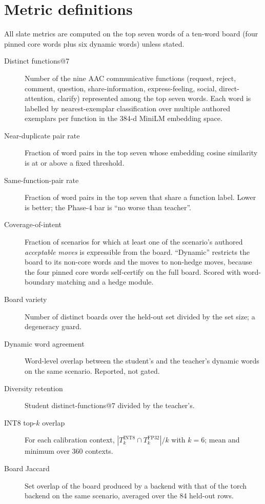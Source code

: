 \section{Metric definitions}\label{app:metrics}

All slate metrics are computed on the top seven words of a ten-word board (four
pinned core words plus six dynamic words) unless stated.

\begin{description}
\item[Distinct functions@7] Number of the nine AAC communicative functions
(request, reject, comment, question, share-information, express-feeling, social,
direct-attention, clarify) represented among the top seven words. Each word is
labelled by nearest-exemplar classification over multiple authored exemplars per
function in the 384-d MiniLM embedding space.
\item[Near-duplicate pair rate] Fraction of word pairs in the top seven whose
embedding cosine similarity is at or above a fixed threshold.
\item[Same-function-pair rate] Fraction of word pairs in the top seven that share
a function label. Lower is better; the Phase-4 bar is ``no worse than teacher''.
\item[Coverage-of-intent] Fraction of scenarios for which at least one of the
scenario's authored \emph{acceptable moves} is expressible from the board.
``Dynamic'' restricts the board to its non-core words and the moves to
non-hedge moves, because the four pinned core words self-certify on the full
board. Scored with word-boundary matching and a hedge module.
\item[Board variety] Number of distinct boards over the held-out set divided by
the set size; a degeneracy guard.
\item[Dynamic word agreement] Word-level overlap between the student's and the
teacher's dynamic words on the same scenario. Reported, not gated.
\item[Diversity retention] Student distinct-functions@7 divided by the teacher's.
\item[INT8 top-$k$ overlap] For each calibration context, $|T_k^{\mathrm{INT8}}
\cap T_k^{\mathrm{FP32}}|/k$ with $k{=}6$; mean and minimum over 360 contexts.
\item[Board Jaccard] Set overlap of the board produced by a backend with that of
the torch backend on the same scenario, averaged over the 84 held-out rows.
\end{description}

